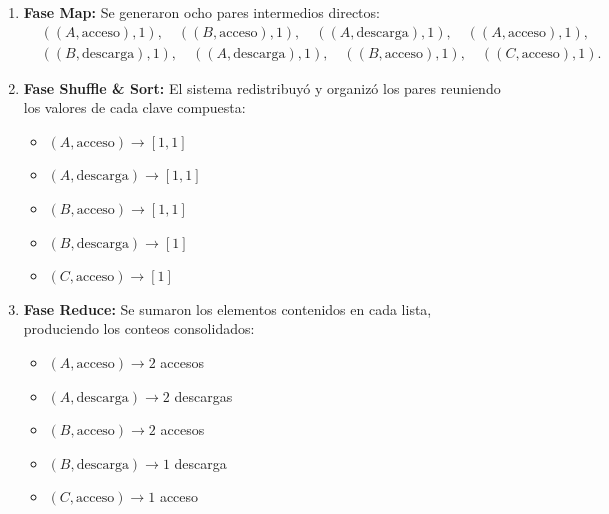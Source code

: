 \documentclass[12pt,a4paper]{article}
\begin{document}
\begin{enumerate}
    \item \textbf{Fase Map:} Se generaron ocho pares intermedios directos:
    \begin{align*}
        &((A, \text{acceso}), 1), \quad ((B, \text{acceso}), 1), \quad ((A, \text{descarga}), 1), \quad ((A, \text{acceso}), 1), \\
        &((B, \text{descarga}), 1), \quad ((A, \text{descarga}), 1), \quad ((B, \text{acceso}), 1), \quad ((C, \text{acceso}), 1).
    \end{align*}
    
    \item \textbf{Fase Shuffle \& Sort:} El sistema redistribuyó y organizó los pares reuniendo los valores de cada clave compuesta:
    \begin{itemize}
        \item $(A, \text{acceso}) \longrightarrow [1, 1]$
        \item $(A, \text{descarga}) \longrightarrow [1, 1]$
        \item $(B, \text{acceso}) \longrightarrow [1, 1]$
        \item $(B, \text{descarga}) \longrightarrow [1]$
        \item $(C, \text{acceso}) \longrightarrow [1]$
    \end{itemize}

    \item \textbf{Fase Reduce:} Se sumaron los elementos contenidos en cada lista, produciendo los conteos consolidados:
    \begin{itemize}
        \item $(A, \text{acceso}) \longrightarrow 2$ accesos
        \item $(A, \text{descarga}) \longrightarrow 2$ descargas
        \item $(B, \text{acceso}) \longrightarrow 2$ accesos
        \item $(B, \text{descarga}) \longrightarrow 1$ descarga
        \item $(C, \text{acceso}) \longrightarrow 1$ acceso
    \end{itemize}
\end{enumerate}
\end{document}
